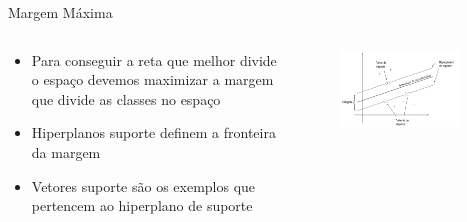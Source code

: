 \documentclass{beamer}
\begin{document}
\begin{frame}{Margem Máxima}
\begin{columns}
    \begin{column}{.49\textwidth}
      \begin{itemize}
      \item Para conseguir a reta que melhor divide o espaço devemos maximizar a margem que divide as classes no espaço
      \item Hiperplanos suporte definem a fronteira da margem
      \item Vetores suporte são os exemplos que pertencem ao hiperplano de suporte
      \end{itemize}
    \end{column}
    \begin{column}{.49\textwidth}
    \begin{figure}
      \centering
      \includegraphics[width=0.9\textwidth]{svm_3.png}
    \end{figure}
    \end{column}
\end{columns}
\end{frame}
\end{document}
